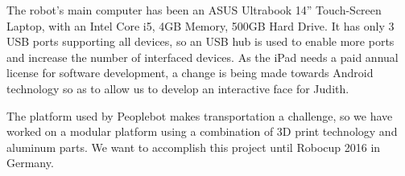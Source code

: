 The robot's main computer has been an ASUS Ultrabook 14'' Touch-Screen Laptop, with an Intel Core i5, 4GB Memory, 500GB Hard Drive. It has only 3 USB ports supporting all devices, so an USB hub is used to enable more ports and increase the number of interfaced devices. As the iPad needs a paid annual license for software development, a change is being made towards Android technology so as to allow us to develop an interactive face for Judith.

The platform used by Peoplebot makes transportation a challenge, so we have worked on a modular platform using a combination of 3D print technology and aluminum parts. We want to accomplish this project until Robocup 2016 in Germany.
